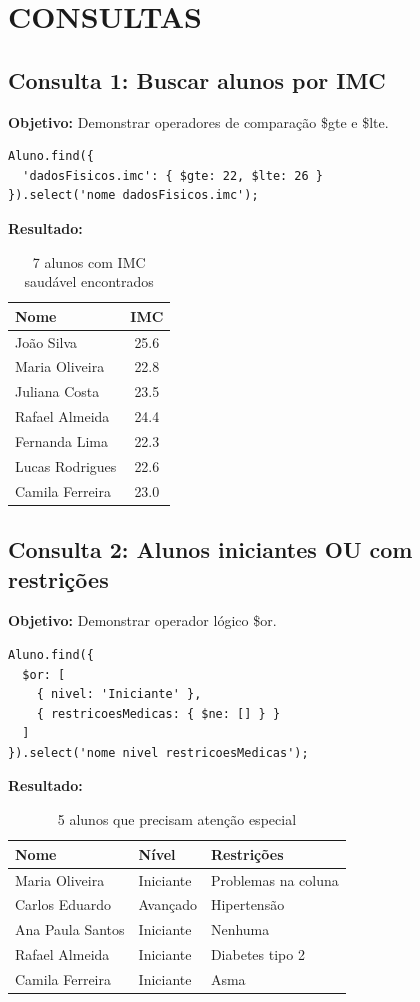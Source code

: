 \documentclass[12pt,a4paper]{article}
\begin{document}
\section{CONSULTAS}

\subsection{Consulta 1: Buscar alunos por IMC}

\textbf{Objetivo:} Demonstrar operadores de comparação \$gte e \$lte.

\begin{lstlisting}[caption=Query 1 - IMC]
Aluno.find({
  'dadosFisicos.imc': { $gte: 22, $lte: 26 }
}).select('nome dadosFisicos.imc');
\end{lstlisting}

\textbf{Resultado:}
\begin{table}[h]
\centering
\begin{tabular}{lc}
\toprule
Nome & IMC \\
\midrule
João Silva & 25.6 \\
Maria Oliveira & 22.8 \\
Juliana Costa & 23.5 \\
Rafael Almeida & 24.4 \\
Fernanda Lima & 22.3 \\
Lucas Rodrigues & 22.6 \\
Camila Ferreira & 23.0 \\
\bottomrule
\end{tabular}
\caption{7 alunos com IMC saudável encontrados}
\end{table}

\subsection{Consulta 2: Alunos iniciantes OU com restrições}

\textbf{Objetivo:} Demonstrar operador lógico \$or.

\begin{lstlisting}[caption=Query 2 - Filtro Lógico]
Aluno.find({
  $or: [
    { nivel: 'Iniciante' },
    { restricoesMedicas: { $ne: [] } }
  ]
}).select('nome nivel restricoesMedicas');
\end{lstlisting}

\textbf{Resultado:}
\begin{table}[h]
\centering
\begin{tabular}{lll}
\toprule
Nome & Nível & Restrições \\
\midrule
Maria Oliveira & Iniciante & Problemas na coluna \\
Carlos Eduardo & Avançado & Hipertensão \\
Ana Paula Santos & Iniciante & Nenhuma \\
Rafael Almeida & Iniciante & Diabetes tipo 2 \\
Camila Ferreira & Iniciante & Asma \\
\bottomrule
\end{tabular}
\caption{5 alunos que precisam atenção especial}
\end{table}
\end{document}
